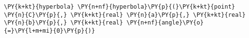 \begin{Verbatim}[commandchars=\\\{\}]
    \PY{k+kt}{hyperbola} \PY{n+nf}{hyperbola}\PY{p}{(}\PY{k+kt}{point} \PY{n}{C}\PY{p}{,} \PY{k+kt}{real} \PY{n}{a}\PY{p}{,} \PY{k+kt}{real} \PY{n}{b}\PY{p}{,} \PY{k+kt}{real} \PY{n+nf}{angle}\PY{o}{=}\PY{l+m+mi}{0}\PY{p}{)}
\end{Verbatim}
